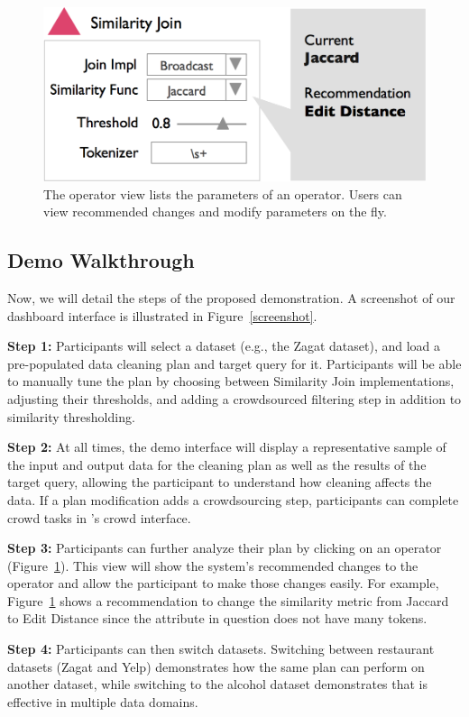 \begin{figure}[t]
\centering
 \includegraphics[width=\columnwidth]{figs/dashboard_recsys.png}
 \caption{The operator view lists the parameters of an operator. Users can view recommended changes and modify parameters on the fly.}
 \label{screenshot-rec}\vspace{-1.75em}
\end{figure}

\subsection{Demo Walkthrough}
Now, we will detail the steps of the proposed demonstration.
A screenshot of our dashboard interface is illustrated in Figure~\ref{screenshot}.

\vspace{0.2em}

\noindent\textbf{Step 1: } Participants will select a dataset (e.g., the Zagat dataset), and load a pre-populated data cleaning plan and target query for it.
Participants will be able to manually tune the plan by choosing between Similarity Join implementations, adjusting their thresholds, and adding a crowdsourced filtering step in addition to similarity thresholding.

\vspace{0.2em}

\noindent\textbf{Step 2: } At all times, the demo interface will display a representative sample of the input and output data for the cleaning plan as well as the results of the target query, allowing the participant to understand how cleaning affects the data. 
If a plan modification adds a crowdsourcing step, participants can complete crowd tasks in \sys's crowd interface.

\vspace{0.2em}

\noindent\textbf{Step 3:} Participants can further analyze their plan by clicking on an operator (Figure~\ref{screenshot-rec}).
This view will show the system's recommended changes to the operator and allow the participant to make those changes easily.
For example, Figure~\ref{screenshot-rec} shows a recommendation to change the similarity metric from Jaccard to Edit Distance since the attribute in question does not have many tokens.

\vspace{0.2em}

\noindent\textbf{Step 4: } Participants can then switch datasets. Switching between restaurant datasets (Zagat and Yelp) demonstrates how the same plan can perform on another dataset, while switching to the alcohol dataset demonstrates that \sys is effective in multiple data domains.
